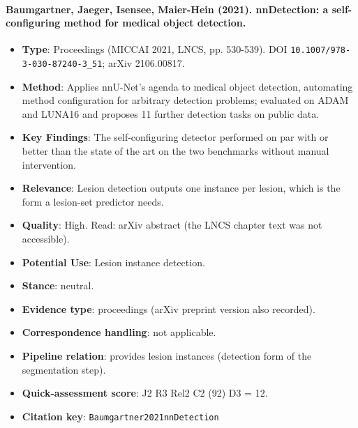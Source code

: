 \documentclass[journal,onecolumn]{IEEEtran}
\begin{document}
\paragraph{Baumgartner, Jaeger, Isensee, Maier-Hein (2021). nnDetection: a self-configuring method for medical object detection.~\cite{Baumgartner2021nnDetection}}\mbox{}

\begin{itemize}

\item{} \textbf{Type}: Proceedings (MICCAI 2021, LNCS, pp. 530-539). DOI \nolinkurl{10.1007/978-3-030-87240-3_51}; arXiv 2106.00817.

\item{} \textbf{Method}: Applies nnU-Net's agenda to medical object detection, automating method configuration for arbitrary detection problems; evaluated on ADAM and LUNA16 and proposes 11 further detection tasks on public data.

\item{} \textbf{Key Findings}: The self-configuring detector performed on par with or better than the state of the art on the two benchmarks without manual intervention.

\item{} \textbf{Relevance}: Lesion detection outputs one instance per lesion, which is the form a lesion-set predictor needs.

\item{} \textbf{Quality}: High. Read: arXiv abstract (the LNCS chapter text was not accessible).

\item{} \textbf{Potential Use}: Lesion instance detection.

\item{} \textbf{Stance}: neutral.

\item{} \textbf{Evidence type}: proceedings (arXiv preprint version also recorded).

\item{} \textbf{Correspondence handling}: not applicable.

\item{} \textbf{Pipeline relation}: provides lesion instances (detection form of the segmentation step).

\item{} \textbf{Quick-assessment score}: J2 R3 Rel2 C2 (92) D3 = 12.

\item{} \textbf{Citation key}: \texttt{Baumgartner2021nnDetection}

\end{itemize}
\end{document}
